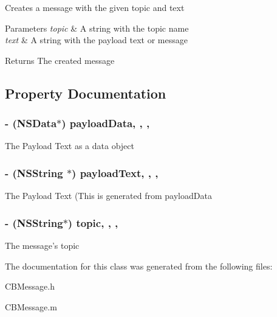 Creates a message with the given topic and text 
\begin{DoxyParams}{Parameters}
{\em topic} & A string with the topic name \\
\hline
{\em text} & A string with the payload text or message \\
\hline
\end{DoxyParams}
\begin{DoxyReturn}{Returns}
The created message 
\end{DoxyReturn}


\subsection{Property Documentation}
\hypertarget{interface_c_b_message_a11c9f8c3e5d3e137f6d735ffb3fa7560}{
\subsubsection[{payload\+Data}]{\setlength{\rightskip}{0pt plus 5cm}-\/ (N\+S\+Data$\ast$) payload\+Data\hspace{0.3cm}{\ttfamily [read]}, {\ttfamily [write]}, {\ttfamily [nonatomic]}, {\ttfamily [strong]}}}\label{interface_c_b_message_a11c9f8c3e5d3e137f6d735ffb3fa7560}
The Payload Text as a data object \hypertarget{interface_c_b_message_a40254070a83d97673d850d08437fc44b}{
\subsubsection[{payload\+Text}]{\setlength{\rightskip}{0pt plus 5cm}-\/ (N\+S\+String $\ast$) payload\+Text\hspace{0.3cm}{\ttfamily [read]}, {\ttfamily [write]}, {\ttfamily [nonatomic]}, {\ttfamily [strong]}}}\label{interface_c_b_message_a40254070a83d97673d850d08437fc44b}
The Payload Text (This is generated from payload\+Data \hypertarget{interface_c_b_message_a5fef01f2b51495307023ad95e772c632}{
\subsubsection[{topic}]{\setlength{\rightskip}{0pt plus 5cm}-\/ (N\+S\+String$\ast$) topic\hspace{0.3cm}{\ttfamily [read]}, {\ttfamily [write]}, {\ttfamily [nonatomic]}, {\ttfamily [strong]}}}\label{interface_c_b_message_a5fef01f2b51495307023ad95e772c632}
The message's topic 

The documentation for this class was generated from the following files\+:\begin{DoxyCompactItemize}
\item 
C\+B\+Message.\+h\item 
C\+B\+Message.\+m\end{DoxyCompactItemize}
